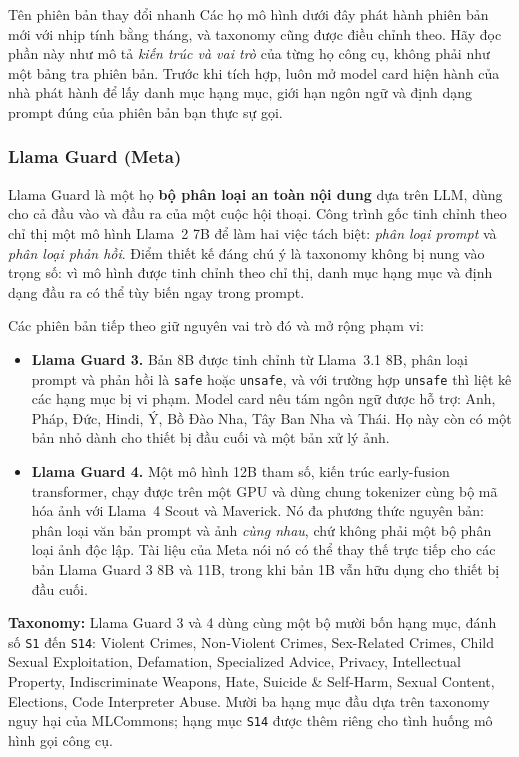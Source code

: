 \begin{pitfall}{Tên phiên bản thay đổi nhanh}
Các họ mô hình dưới đây phát hành phiên bản mới với nhịp tính bằng tháng, và taxonomy cũng được điều chỉnh theo. Hãy đọc phần này như mô tả \emph{kiến trúc và vai trò} của từng họ công cụ, không phải như một bảng tra phiên bản. Trước khi tích hợp, luôn mở model card hiện hành của nhà phát hành để lấy danh mục hạng mục, giới hạn ngôn ngữ và định dạng prompt đúng của phiên bản bạn thực sự gọi.
\end{pitfall}

\subsubsection{Llama Guard (Meta)}

Llama Guard là một họ \textbf{bộ phân loại an toàn nội dung} dựa trên LLM, dùng cho cả đầu vào và đầu ra của một cuộc hội thoại. Công trình gốc \cite{inan2023llamaguard} tinh chỉnh theo chỉ thị một mô hình Llama~2 7B để làm hai việc tách biệt: \emph{phân loại prompt} và \emph{phân loại phản hồi}. Điểm thiết kế đáng chú ý là taxonomy không bị nung vào trọng số: vì mô hình được tinh chỉnh theo chỉ thị, danh mục hạng mục và định dạng đầu ra có thể tùy biến ngay trong prompt.

Các phiên bản tiếp theo giữ nguyên vai trò đó và mở rộng phạm vi:

\begin{itemize}
	\item \textbf{Llama Guard 3.} Bản 8B được tinh chỉnh từ Llama~3.1 8B, phân loại prompt và phản hồi là \texttt{safe} hoặc \texttt{unsafe}, và với trường hợp \texttt{unsafe} thì liệt kê các hạng mục bị vi phạm. Model card nêu tám ngôn ngữ được hỗ trợ: Anh, Pháp, Đức, Hindi, Ý, Bồ Đào Nha, Tây Ban Nha và Thái. Họ này còn có một bản nhỏ dành cho thiết bị đầu cuối và một bản xử lý ảnh.
	\item \textbf{Llama Guard 4.} Một mô hình 12B tham số, kiến trúc early-fusion transformer, chạy được trên một GPU và dùng chung tokenizer cùng bộ mã hóa ảnh với Llama~4 Scout và Maverick. Nó đa phương thức nguyên bản: phân loại văn bản prompt và ảnh \emph{cùng nhau}, chứ không phải một bộ phân loại ảnh độc lập. Tài liệu của Meta nói nó có thể thay thế trực tiếp cho các bản Llama Guard 3 8B và 11B, trong khi bản 1B vẫn hữu dụng cho thiết bị đầu cuối.
\end{itemize}

\textbf{Taxonomy:} Llama Guard 3 và 4 dùng cùng một bộ mười bốn hạng mục, đánh số \texttt{S1} đến \texttt{S14}: Violent Crimes, Non-Violent Crimes, Sex-Related Crimes, Child Sexual Exploitation, Defamation, Specialized Advice, Privacy, Intellectual Property, Indiscriminate Weapons, Hate, Suicide \& Self-Harm, Sexual Content, Elections, Code Interpreter Abuse. Mười ba hạng mục đầu dựa trên taxonomy nguy hại của MLCommons; hạng mục \texttt{S14} được thêm riêng cho tình huống mô hình gọi công cụ.

